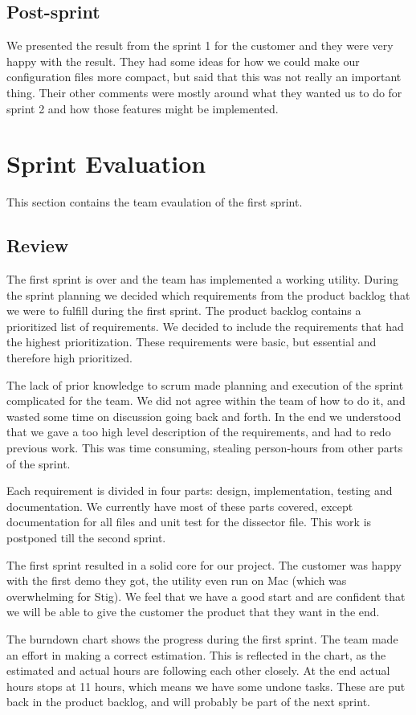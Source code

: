 \subsection{Post-sprint}
We presented the result from the sprint 1 for the customer and they were very happy with the result. They had some ideas for how we could make our configuration files more compact, but said that this was not really an important thing. Their other comments were mostly around what they wanted us to do for sprint 2 and how those features might be implemented.

\section{Sprint Evaluation}
This section contains the team evaulation of the first sprint.
\subsection{Review}
The first sprint is over and the team has implemented a working utility. During the sprint planning we decided which requirements from the product backlog that we were to fulfill during the first sprint. The product backlog contains a prioritized list of requirements. We decided to include the requirements that had the highest prioritization. These requirements were basic, but essential and therefore high prioritized.
   
The lack of prior knowledge to scrum made planning and execution of the sprint complicated for the team. We did not agree within the team of how to do it, and wasted some time on discussion going back and forth. In the end we understood that we gave a too high level description of the requirements, and had to redo previous work. This was time consuming, stealing person-hours from other parts of the sprint.

Each requirement is divided in four parts: design, implementation, testing and documentation. We currently have most of these parts covered, except documentation for all files and unit test for the dissector file. This work is postponed till the second sprint.

The first sprint resulted in a solid core for our project. The customer was happy with the first demo they got, the utility even run on Mac (which was overwhelming for Stig). We feel that we have a good start and are confident that we will be able to give the customer the product that they want in the end.

The burndown chart shows the progress during the first sprint. The team made an effort in making a correct estimation. This is reflected in the chart, as the estimated and actual hours are  following each other closely. At the end actual hours stops at 11 hours, which means we have some undone tasks. These are put back in the product backlog, and will probably be part of the next sprint. 

